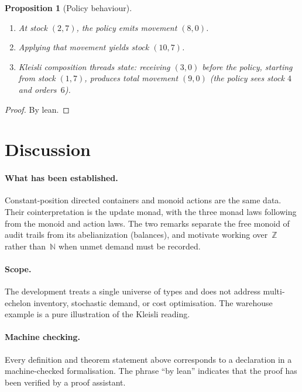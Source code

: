 \documentclass[11pt,a4paper]{article}
\theoremstyle{plain}
\newtheorem{proposition}[theorem]{Proposition}
\theoremstyle{definition}
\begin{document}
\begin{proposition}[Policy behaviour]\label{prop:policy}
\begin{enumerate}
  \item At stock $(2,7)$, the policy emits movement $(8,0)$.
  \item Applying that movement yields stock $(10,7)$.
  \item Kleisli composition threads state: receiving $(3,0)$ before the
        policy, starting from stock $(1,7)$, produces total movement
        $(9,0)$ (the policy sees stock $4$ and orders~$6$).
\end{enumerate}
\end{proposition}

\begin{proof}
By lean.
\end{proof}

\section{Discussion}

\paragraph{What has been established.}
Constant-position directed containers and monoid actions are the same
data. Their cointerpretation is the update monad, with the three monad
laws following from the monoid and action laws. The two remarks separate
the free monoid of audit trails from its abelianization (balances), and
motivate working over~$\mathbb{Z}$ rather than~$\mathbb{N}$ when unmet
demand must be recorded.

\paragraph{Scope.}
The development treats a single universe of types and does not address
multi-echelon inventory, stochastic demand, or cost optimisation. The
warehouse example is a pure illustration of the Kleisli reading.

\paragraph{Machine checking.}
Every definition and theorem statement above corresponds to a declaration
in a machine-checked formalisation. The phrase ``by lean'' indicates that
the proof has been verified by a proof assistant.
\end{document}
